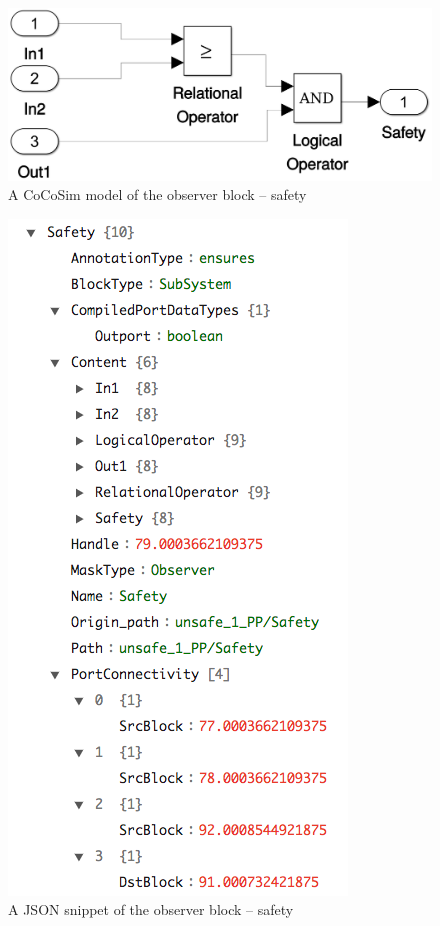 \documentclass{article}
\begin{document}
\begin{figure}[h]
\begin{center}
  \includegraphics[scale=0.18]{figures/safety0}
\end{center}  
  \caption{A CoCoSim model of the observer block -- safety}
  \label{cocosimsafety}
\end{figure}


\begin{figure}[h]
\begin{center}
  \includegraphics[scale=0.3]{figures/safety}
\end{center}  
  \caption{A JSON snippet of the observer block -- safety}
  \label{jsonsafety}
\end{figure}
\end{document}
